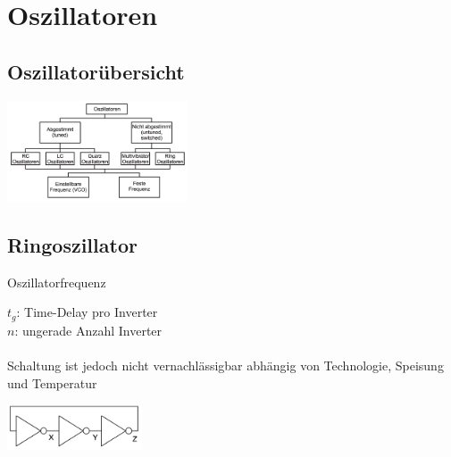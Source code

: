     \section{Oszillatoren}
        \subsection{Oszillator\"ubersicht}
            \includegraphics[height=3cm]{./bilder/OszillatorKlassifikation.png}
            
        \subsection{Ringoszillator}
            \begin{minipage}[T]{8cm}
                Oszillatorfrequenz
                \hspace{14mm}
            \end{minipage}
            \begin{minipage}[T]{6cm}
                $t_g$: Time-Delay pro Inverter\\
                $n$: ungerade Anzahl Inverter\\\\
                Schaltung ist jedoch nicht vernachl\"assigbar abh\"angig von Technologie, Speisung und Temperatur
            \end{minipage}
            \begin{minipage}{4cm}
                \hspace*{5mm}
                \includegraphics[width=4cm]{./bilder/Ringoszillator.png}
            \end{minipage}\\
            
